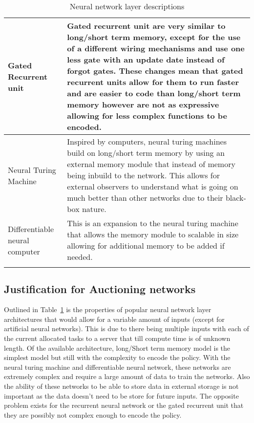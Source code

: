 \begin{longtable}{|p{3.5cm}|p{11cm}|}
    Gated Recurrent unit~\citep{GRU} & Gated recurrent unit are very similar to long/short term memory, except for the
        use of a different wiring mechanisms and use one less gate with an update date instead of forgot gates.
        These changes mean that gated recurrent units allow for them to run faster and are easier to code than
        long/short term memory however are not as expressive allowing for less complex functions to be encoded. \\ \hline

    Neural Turing Machine~\citep{NTM} & Inspired by computers, neural turing machines build on long/short term memory
        by using an external memory module that instead of memory being inbuild to the network. This allows for
        external observers to understand what is going on much better than other networks due to their
        black-box nature. \\ \hline

    Differentiable neural computer~\citep{DNC} & This is an expansion to the neural turing machine that allows the
        memory module to scalable in size allowing for additional memory to be added if needed. \\ \hline
    \caption{Neural network layer descriptions}
    \label{tab:neural_network_layers}
\end{longtable}

\subsection{Justification for Auctioning networks}\label{subsec:justification-for-auctioning-networks}
Outlined in Table~\ref{tab:neural_network_layers} is the properties of popular neural network layer architectures that
would allow for a variable amount of inputs (except for artificial neural networks). This is due to there being
multiple inputs with each of the current allocated tasks to a server that till compute time is of unknown length. Of
the available architecture, long/Short term memory model is the simplest model but still with the complexity to encode
the policy. With the neural turing machine and differentiable neural network, these networks are extremely complex and
require a large amount of data to train the networks. Also the ability of these networks to be able to store data in
external storage is not important as the data doesn't need to be store for future inputs. The opposite problem exists
for the recurrent neural network or the gated recurrent unit that they are possibly not complex enough to encode the
policy.

